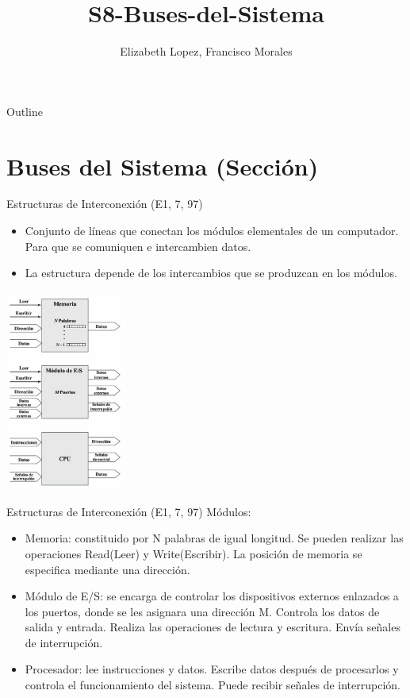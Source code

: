 \documentclass[presentation]{beamer}
\author{Elizabeth Lopez, Francisco Morales}
\date{}
\title{S8-Buses-del-Sistema}
\begin{document}
\maketitle
\begin{frame}{Outline}
\tableofcontents
\end{frame}



\section{Buses del Sistema (Sección)}
\label{sec:orgd090569}
\begin{frame}[label={sec:orge7c8b61}]{Estructuras de Interconexión (E1, 7, 97)}
\begin{itemize}
\item Conjunto de líneas que conectan los módulos elementales de un computador.
Para que se comuniquen e intercambien datos.
\item La estructura depende de los intercambios que se produzcan en los módulos.
\end{itemize}

\begin{center}
\includegraphics[width=0.3\textwidth]{./Images/Modulos.jpg}
\end{center}
\end{frame}

\begin{frame}[label={sec:orgc096434}]{Estructuras de Interconexión (E1, 7, 97)}
\alert{Módulos:}

\begin{itemize}
\item \alert{\alert{Memoria:}} constituido por N palabras de igual longitud. Se pueden realizar las
operaciones Read(Leer) y Write(Escribir). La posición de memoria se especifica
mediante una dirección.
\item \alert{\alert{Módulo de E/S:}} se encarga de controlar los dispositivos externos enlazados
a los puertos, donde se les asignara una dirección M. Controla los datos de salida
y entrada. Realiza las operaciones de lectura y escritura. Envía señales de interrupción.
\item \alert{\alert{Procesador:}} lee instrucciones y datos. Escribe datos después de procesarlos y
controla el funcionamiento del sistema. Puede recibir señales de interrupción.
\end{itemize}
\end{frame}
\end{document}
